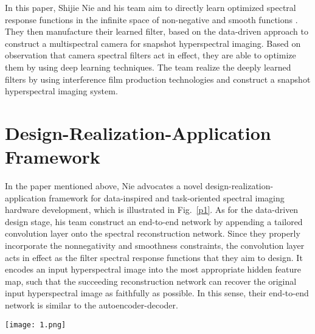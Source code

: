 \documentclass[10pt,twocolumn,letterpaper]{article}
\begin{document}
In this paper, Shijie Nie and his team aim to directly learn optimized spectral response functions in the infinite space of non-negative and smooth functions \cite{De2018}. They then manufacture their learned filter, based on the data-driven approach to construct a multispectral camera for snapshot hyperspectral imaging. Based on observation that camera spectral filters act in effect, they are able to optimize them by using deep learning techniques. The team realize the deeply learned filters by using interference film production technologies and construct a snapshot hyperspectral imaging system.

\section{Design-Realization-Application Framework}

In the paper mentioned above, Nie advocates a novel design-realization-application framework for data-inspired and task-oriented spectral imaging hardware development, which is illustrated in Fig.~\ref{p1}. As for the data-driven design stage, his team construct an end-to-end network by appending a tailored convolution layer onto the spectral reconstruction network. Since they properly incorporate the nonnegativity and smoothness constraints, the convolution layer acts in effect as the filter spectral response functions that they aim to design. It encodes an input hyperspectral image into the most appropriate hidden feature map, such that the succeeding reconstruction network can recover the original input hyperspectral image as faithfully as possible. In this sense, their end-to-end network is similar to the autoencoder-decoder. 
\begin{figure*}
	\begin{center}
		\texttt{[image: 1.png]}
	\end{center}
	\caption{Their proposed design-realization-application framework for data-inspired spectral imaging hardware. The design stage (marked in blue arrow) is data-driven. It includes an end-to-end network to simultaneously learn the filter response and the spectral reconstruction mapping. The learned spectral response function on CAVE dataset is also shown. In the realization stage (marked in red arrow), the learned response functions are realized by using film filter production technologies, and a data-inspired multispectral camera is constructed. In the online application stage, the captured multispectral image is imported into the already trained spectral reconstruction network to generate hyperspectral images. This framework is illustrated using the multi-chip setup with three channels.}
	\label{p1}
\end{figure*}
\end{document}
